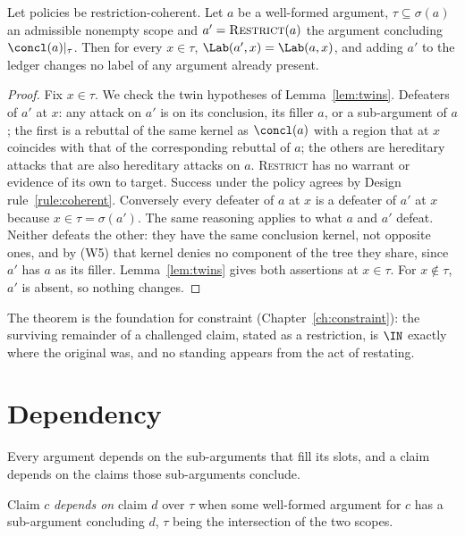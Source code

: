 \begin{theorem}\label{thm:restrictstatus}
Let policies be restriction-coherent. Let $a$ be a well-formed argument, $\tau\subseteq\sigma(a)$ an admissible nonempty scope and $a'=\textsc{Restrict}(a)$ the argument concluding $\concl(a)|_\tau$. Then for every $x\in\tau$, $\Lab(a',x)=\Lab(a,x)$, and adding $a'$ to the ledger changes no label of any argument already present.
\end{theorem}

\begin{proof}
Fix $x\in\tau$. We check the twin hypotheses of Lemma~\ref{lem:twins}. Defeaters of $a'$ at $x$: any attack on $a'$ is on its conclusion, its filler $a$, or a sub-argument of $a$; the first is a rebuttal of the same kernel as $\concl(a)$ with a region that at $x$ coincides with that of the corresponding rebuttal of $a$; the others are hereditary attacks that are also hereditary attacks on $a$. \textsc{Restrict} has no warrant or evidence of its own to target. Success under the policy agrees by Design rule~\ref{rule:coherent}. Conversely every defeater of $a$ at $x$ is a defeater of $a'$ at $x$ because $x\in\tau=\sigma(a')$. The same reasoning applies to what $a$ and $a'$ defeat. Neither defeats the other: they have the same conclusion kernel, not opposite ones, and by (W5) that kernel denies no component of the tree they share, since $a'$ has $a$ as its filler. Lemma~\ref{lem:twins} gives both assertions at $x\in\tau$. For $x\notin\tau$, $a'$ is absent, so nothing changes.
\end{proof}

The theorem is the foundation for constraint (Chapter~\ref{ch:constraint}): the surviving remainder of a challenged claim, stated as a restriction, is $\IN$ exactly where the original was, and no standing appears from the act of restating.

\section{Dependency}

Every argument depends on the sub-arguments that fill its slots, and a claim depends on the claims those sub-arguments conclude.

\begin{definition}
Claim $c$ \emph{depends on} claim $d$ over $\tau$ when some well-formed argument for $c$ has a sub-argument concluding $d$, $\tau$ being the intersection of the two scopes.
\end{definition}

